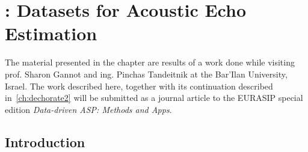 \chapter{: Datasets for Acoustic Echo Estimation}\label{ch:dechorate}

\vspace{-2.5em}

 \synopsisChDechorate


\mynewline
The material presented in the chapter are results of a work done while visiting prof. Sharon Gannot and ing. Pinchas Tandeitnik at the Bar'Ilan University, Israel.
The work described here, together with its continuation described in~\cref{ch:dechorate2} will be submitted as a journal article to the EURASIP special edition \textit{Data-driven ASP: Methods and Apps}.


\section{Introduction}\label{sec:dechorate:intro}


